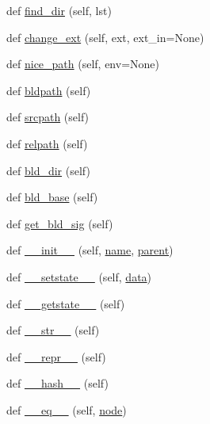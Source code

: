 \begin{DoxyCompactItemize}
def \hyperlink{classwaflib_1_1_node_1_1_node_a6b0cb5708818ef6483466202ece39049}{find\+\_\+dir} (self, lst)
\item 
def \hyperlink{classwaflib_1_1_node_1_1_node_ad8e6f438a9b4e34994c8ef82c3b7649d}{change\+\_\+ext} (self, ext, ext\+\_\+in=None)
\item 
def \hyperlink{classwaflib_1_1_node_1_1_node_a84dd8d16929674c2a4dadcc078d9d314}{nice\+\_\+path} (self, env=None)
\item 
def \hyperlink{classwaflib_1_1_node_1_1_node_a1e67abe7b66ef0abd91795547e14a7b7}{bldpath} (self)
\item 
def \hyperlink{classwaflib_1_1_node_1_1_node_a135bd20c340d064fb59d2c8f329fec50}{srcpath} (self)
\item 
def \hyperlink{classwaflib_1_1_node_1_1_node_a4bc57e86dc18da4ce8fc9a669a829186}{relpath} (self)
\item 
def \hyperlink{classwaflib_1_1_node_1_1_node_ae2103a3fade78458d40298173d7179a3}{bld\+\_\+dir} (self)
\item 
def \hyperlink{classwaflib_1_1_node_1_1_node_a56b26245067bfe835f32199e74135a8a}{bld\+\_\+base} (self)
\item 
def \hyperlink{classwaflib_1_1_node_1_1_node_a804270edff72f7bc520841fa60a494e4}{get\+\_\+bld\+\_\+sig} (self)
\item 
def \hyperlink{classwaflib_1_1_node_1_1_node_acf6238a6107f9c667ddd3aee5b30c626}{\+\_\+\+\_\+init\+\_\+\+\_\+} (self, \hyperlink{lib_2expat_8h_a1b49b495b59f9e73205b69ad1a2965b0}{name}, \hyperlink{classwaflib_1_1_node_1_1_node_a2136fddf4c5e98dc8d1661bee03e725c}{parent})
\item 
def \hyperlink{classwaflib_1_1_node_1_1_node_ae1ce2af534851b1b56bc257f486be757}{\+\_\+\+\_\+setstate\+\_\+\+\_\+} (self, \hyperlink{lib_2expat_8h_ac39e72a1de1cb50dbdc54b08d0432a24}{data})
\item 
def \hyperlink{classwaflib_1_1_node_1_1_node_a5f7b73ba50d8a67499518eacf1946689}{\+\_\+\+\_\+getstate\+\_\+\+\_\+} (self)
\item 
def \hyperlink{classwaflib_1_1_node_1_1_node_aea11f410459c73450de99bd614222100}{\+\_\+\+\_\+str\+\_\+\+\_\+} (self)
\item 
def \hyperlink{classwaflib_1_1_node_1_1_node_a312e0f3ae404d593e43dc8afd8965de9}{\+\_\+\+\_\+repr\+\_\+\+\_\+} (self)
\item 
def \hyperlink{classwaflib_1_1_node_1_1_node_ad2272ed88f10bb1e6e2f473ec38fa5a4}{\+\_\+\+\_\+hash\+\_\+\+\_\+} (self)
\item 
def \hyperlink{classwaflib_1_1_node_1_1_node_a2fce3a217e2e7ef6192cb2e5e0671a4c}{\+\_\+\+\_\+eq\+\_\+\+\_\+} (self, \hyperlink{structnode}{node})

\end{DoxyCompactItemize}
